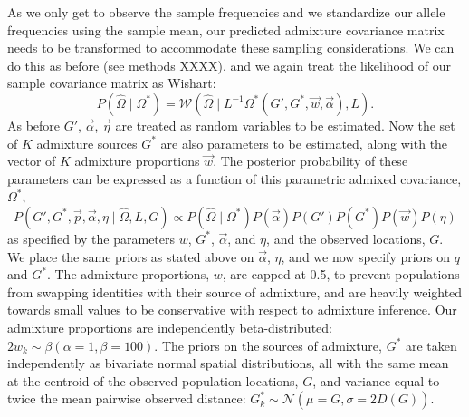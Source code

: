 \documentclass[12pt]{article}
\newcommand{\identifyadmixsource}[1]{{#1^{*}}}
\begin{document}
As we only get to observe the sample frequencies and we standardize our allele frequencies using the sample mean, our predicted admixture covariance matrix needs to be transformed to accommodate these sampling considerations. We can do this as before (see methods XXXX), and we again treat the likelihood of our sample covariance matrix as Wishart:
\begin{equation}
\label{eq:wishart_dist_admixed}
P(\widehat{\Omega} \mid \identifyadmixsource{\Omega}) = 
	\mathcal{W}\left(\widehat{\Omega} \mid L^{-1} \identifyadmixsource{\Omega} \left( G',\identifyadmixsource{G}, \vec{w},\vec{\alpha}\right),L \right)	\text{.}
\end{equation}
As before $G'$, $\vec{\alpha}$, $\vec{\eta}$ are treated as random variables to be estimated. Now the set of $K$ admixture sources $\identifyadmixsource{G}$ are also parameters to be estimated, along with the vector of $K$ admixture proportions $\vec{w}$. The posterior probability of these parameters can be expressed as a function of this parametric admixed covariance, $\identifyadmixsource{\Omega}$,
\begin{equation}
\label{eq:admixed_post_prob}
P(G',\identifyadmixsource{G}, \vec{p},\vec{\alpha}, \eta \mid \widehat{\Omega}, L,G) 
	\propto  
		P(\widehat{\Omega}  \mid \identifyadmixsource{\Omega}) P(\vec{\alpha}) P(G') P(\identifyadmixsource{G}) P(\vec{w}) P(\eta) 
\end{equation}
%
as specified by the parameters $w$, $\identifyadmixsource{G}$, $\vec{\alpha}$, and $\eta$, and the observed locations, $G$.  We place the same priors as stated above on $\vec{\alpha}$, $\eta$, and we now specify priors on $q$ and $\identifyadmixsource{G}$.  The admixture proportions, $w$, are capped at 0.5, to prevent populations from swapping identities with their source of admixture, and are heavily weighted towards small values to be conservative with respect to admixture inference.  Our admixture proportions are independently beta-distributed: $2 w_k \sim \beta(\alpha = 1,\beta = 100)$.  The priors on the sources of admixture, $\identifyadmixsource{G}$ are taken independently as bivariate normal spatial distributions, all with the same mean at the centroid of the observed population locations, $G$, and variance equal to twice the mean pairwise observed distance:  $\identifyadmixsource{G_k} \sim \mathcal{N}(\mu = \bar{G},\sigma = 2 \bar{D}(G))$.


\end{document}
